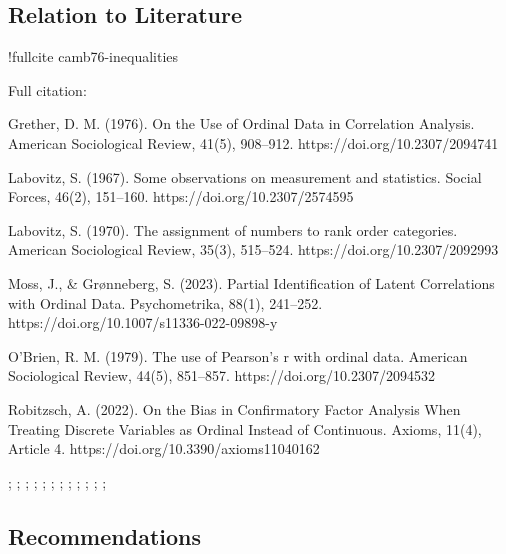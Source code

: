\documentclass[
  12pt,
]{article}
\theoremstyle{plain}
\theoremstyle{definition}
\theoremstyle{remark}
\begin{document}
\subsection{Relation to Literature}\label{relation-to-literature}

!fullcite camb76-inequalities

Full citation:

\textcite{camb76-inequalities}

Grether, D. M. (1976). On the Use of Ordinal Data in Correlation
Analysis. American Sociological Review, 41(5), 908--912.
https://doi.org/10.2307/2094741

Labovitz, S. (1967). Some observations on measurement and statistics.
Social Forces, 46(2), 151--160. https://doi.org/10.2307/2574595

Labovitz, S. (1970). The assignment of numbers to rank order categories.
American Sociological Review, 35(3), 515--524.
https://doi.org/10.2307/2092993

Moss, J., \& Grønneberg, S. (2023). Partial Identification of Latent
Correlations with Ordinal Data. Psychometrika, 88(1), 241--252.
https://doi.org/10.1007/s11336-022-09898-y

O'Brien, R. M. (1979). The use of Pearson's r with ordinal data.
American Sociological Review, 44(5), 851--857.
https://doi.org/10.2307/2094532

Robitzsch, A. (2022). On the Bias in Confirmatory Factor Analysis When
Treating Discrete Variables as Ordinal Instead of Continuous. Axioms,
11(4), Article 4. https://doi.org/10.3390/axioms11040162

\textcite{frec51-tableaux}

\textcite{whit76-bivariate}

\textcite{hoef40-masstabinvariante}

\textcite{lehm66-concepts}

\textcite{tche80-inequalities}

\textcite{camb76-inequalities}

\textcite{shih92-evaluating}

\textcite{alwi91-reliability}; \textcite{brew05-values};
\textcite{flor04-empirical}; \textcite{gait80-measurement};
\textcite{gree97-effect}; \textcite{jaco99-levels};
\textcite{kend38-new}; \textcite{knok02-statistics};
\textcite{kreu07-survey}; \textcite{kros97-designing};
\textcite{labo70-assignment}; \textcite{olss79-maximum};
\textcite{spea04-proof}

\subsection{Recommendations}\label{recommendations}
\end{document}
